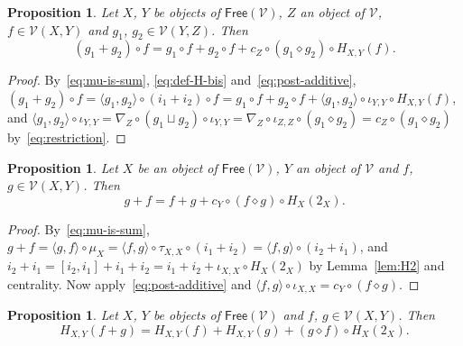 \documentclass[reqno,a4paper]{amsart}
\theoremstyle{plain}
\newtheorem{proposition}[subsection]{Proposition}
\theoremstyle{definition}
\newcommand{\V}{\ensuremath{\mathcal{V}}}
\newcommand{\Free}{\ensuremath{\mathsf{Free}}}
\newcommand{\cosmash}{\ensuremath{\diamond}}
\newcommand{\cosum}{\ensuremath{\sqcup}}                   %
\newcommand{\cc}[1]{\ensuremath{c_{#1}}}                    %
\newcommand{\tw}[2]{\ensuremath{\tau_{#1,#2}}}             %
\newcommand{\fold}[1]{\ensuremath{\nabla_{#1}}}            %
\begin{document}
\begin{proposition}\label{prop:right-distributivity}
  Let \(X\), \(Y\) be objects of \(\Free(\V)\), \(Z\) an object of \(\V\), \(f\in\V(X,Y)\) and \(g_{1}\), \(g_{2}\in\V(Y,Z)\). Then
  \[
    (g_{1}+g_{2})\circ f=g_{1}\circ f+g_{2}\circ f+\cc{Z}\circ(g_{1}\cosmash g_{2})\circ H_{X,Y}(f)\text{.}
  \]
\end{proposition}

\begin{proof}
  By~\eqref{eq:mu-is-sum}, \eqref{eq:def-H-bis} and~\eqref{eq:post-additive}, \((g_{1}+g_{2})\circ f=\langle g_{1},g_{2}\rangle\circ(i_{1}+i_{2})\circ f=g_{1}\circ f+g_{2}\circ f+\langle g_{1},g_{2}\rangle\circ\iota_{Y,Y}\circ H_{X,Y}(f)\), and \(\langle g_{1},g_{2}\rangle\circ\iota_{Y,Y}=\fold{Z}\circ(g_{1}\cosum g_{2})\circ\iota_{Y,Y}=\fold{Z}\circ\iota_{Z,Z}\circ(g_{1}\cosmash g_{2})=\cc{Z}\circ(g_{1}\cosmash g_{2})\) by~\eqref{eq:restriction}.
\end{proof}

\begin{proposition}\label{prop:commutator}
  Let \(X\) be an object of \(\Free(\V)\), \(Y\) an object of \(\V\) and \(f\), \(g\in\V(X,Y)\). Then
  \[
    g+f=f+g+\cc{Y}\circ(f\cosmash g)\circ H_{X}(2_{X})\text{.}
  \]
\end{proposition}

\begin{proof}
  By~\eqref{eq:mu-is-sum}, \(g+f=\langle g,f\rangle\circ\mu_{X}=\langle f,g\rangle\circ\tw{X}{X}\circ(i_{1}+i_{2})=\langle f,g\rangle\circ(i_{2}+i_{1})\), and \(i_{2}+i_{1}=[i_{2},i_{1}]+i_{1}+i_{2}=i_{1}+i_{2}+\iota_{X,X}\circ H_{X}(2_{X})\) by Lemma~\ref{lem:H2} and centrality. Now apply~\eqref{eq:post-additive} and \(\langle f,g\rangle\circ\iota_{X,X}=\cc{Y}\circ(f\cosmash g)\).
\end{proof}

\begin{proposition}\label{prop:H-sum}
  Let \(X\), \(Y\) be objects of \(\Free(\V)\) and \(f\), \(g\in\V(X,Y)\). Then
  \[
    H_{X,Y}(f+g)=H_{X,Y}(f)+H_{X,Y}(g)+(g\cosmash f)\circ H_{X}(2_{X})\text{.}
  \]
\end{proposition}
\end{document}

